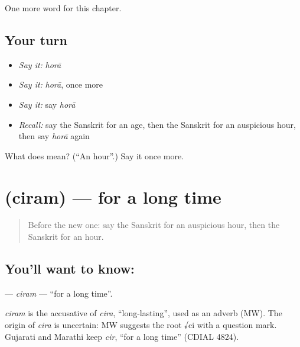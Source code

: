 \begin{grammarlens}[title={What you've built}]
One more word for this chapter.
\end{grammarlens}

\subsection*{Your turn}
\begin{itemize}
\raggedright
  \item \emph{Say it:} \emph{horā}
  \item \emph{Say it:} \emph{horā}, once more
  \item \emph{Say it:} say \emph{horā}
  \item \emph{Recall:} say the Sanskrit for an age, then the Sanskrit for an auspicious hour, then say \emph{horā} again
\end{itemize}

\begin{tcolorbox}[breakable,colback=teal!4,colframe=teal!35!black,title={Before you move on}]
What does  mean? (\textquotedblleft{}An hour\textquotedblright{}.) Say it once more.
\end{tcolorbox}
\section[\texorpdfstring{\sk{चिरम्} (ciram)}{चिरम् (ciram)}]{ (ciram) — for a long time}

\label{lesson:SA-C183-ciram}



\begin{quote}
Before the new one: say the Sanskrit for an auspicious hour, then the Sanskrit for an hour.
\end{quote}

\subsection*{You'll want to know: }
\textbf{} — \emph{ciram} — \textquotedblleft{}for a long time\textquotedblright{}.

\begin{cousinweb}
\emph{ciram} is the accusative of \emph{cira}, \textquotedblleft{}long-lasting\textquotedblright{}, used as an adverb (MW). The origin of \emph{cira} is uncertain: MW suggests the root √ci with a question mark. Gujarati and Marathi keep \emph{cir}, \textquotedblleft{}for a long time\textquotedblright{} (CDIAL 4824).
\end{cousinweb}

